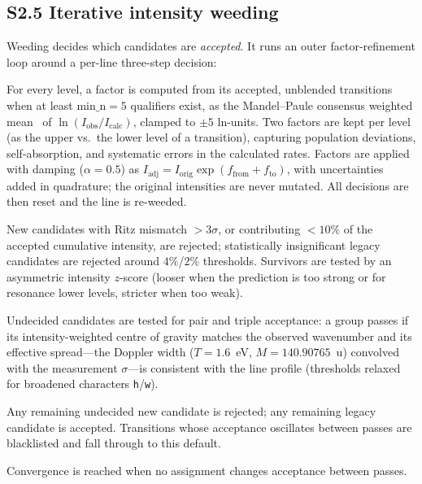 \documentclass[10pt]{article}
\begin{document}
\subsection*{S2.5 Iterative intensity weeding}
\label{ssec:weed}
Weeding decides which candidates are \emph{accepted}. It runs an outer
factor-refinement loop around a per-line three-step decision:
\begin{description}[leftmargin=1.4em,style=nextline]
  \item[Per-level intensity factors.] For every level, a factor is
    computed from its accepted, unblended transitions when at least
    $\text{min\_n}=5$ qualifiers exist, as the Mandel--Paule consensus
    weighted mean~\cite{Paule_Mandel_1982} of $\ln(I_{\text{obs}}/I_{\text{calc}})$,
    clamped to $\pm 5$ ln-units. Two factors are kept per level (as the
    upper vs.\ the lower level of a transition), capturing population
    deviations, self-absorption, and systematic errors in the calculated
    rates. Factors are applied with damping ($\alpha=0.5$) as
    $I_{\text{adj}} = I_{\text{orig}}\exp(f_{\text{from}}+f_{\text{to}})$,
    with uncertainties added in quadrature; the original intensities are
    never mutated. All decisions are then reset and the line is re-weeded.
  \item[Step 1 --- clear-cut decisions.] New candidates with Ritz mismatch
    $> 3\sigma$, or contributing $< 10\%$ of the accepted cumulative
    intensity, are rejected; statistically insignificant legacy candidates
    are rejected around $4\%$/$2\%$ thresholds. Survivors are tested by an
    asymmetric intensity $z$-score (looser when the prediction is too
    strong or for resonance lower levels, stricter when too weak).
  \item[Step 2 --- grouping.] Undecided candidates are tested for pair and
    triple acceptance: a group passes if its intensity-weighted centre of
    gravity matches the observed wavenumber and its effective spread---the
    Doppler width ($T=1.6$~eV, $M=140.90765$~u) convolved with the
    measurement $\sigma$---is consistent with the line profile (thresholds
    relaxed for broadened characters \texttt{h}/\texttt{w}).
  \item[Step 3 --- defaults.] Any remaining undecided new candidate is
    rejected; any remaining legacy candidate is accepted. Transitions whose
    acceptance oscillates between passes are blacklisted and fall through
    to this default.
\end{description}
Convergence is reached when no assignment changes acceptance between passes.
\end{document}
